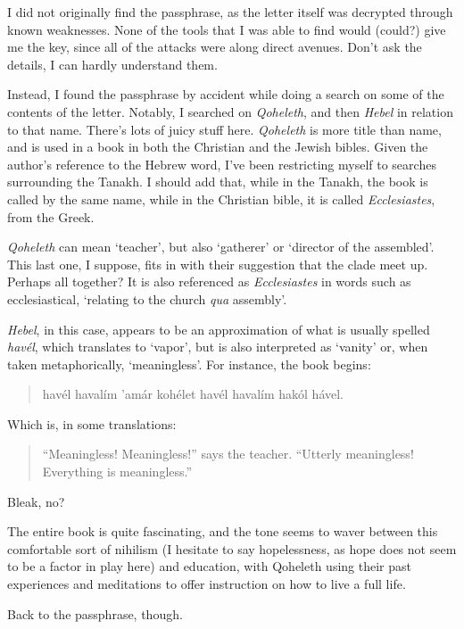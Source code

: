 I did not originally find the passphrase, as the letter itself was decrypted through known weaknesses. None of the tools that I was able to find would (could?) give me the key, since all of the attacks were along direct avenues. Don't ask the details, I can hardly understand them.

Instead, I found the passphrase by accident while doing a search on some of the contents of the letter. Notably, I searched on \emph{Qoheleth}, and then \emph{Hebel} in relation to that name. There's lots of juicy stuff here. \emph{Qoheleth} is more title than name, and is used in a book in both the Christian and the Jewish bibles. Given the author's reference to the Hebrew word, I've been restricting myself to searches surrounding the Tanakh. I should add that, while in the Tanakh, the book is called by the same name, while in the Christian bible, it is called \emph{Ecclesiastes}, from the Greek.

\emph{Qoheleth} can mean `teacher', but also `gatherer' or `director of the assembled'. This last one, I suppose, fits in with their suggestion that the clade meet up. Perhaps all together? It is also referenced as \emph{Ecclesiastes} in words such as ecclesiastical, `relating to the church \emph{qua} assembly'.

\emph{Hebel}, in this case, appears to be an approximation of what is usually spelled \emph{havél}, which translates to `vapor', but is also interpreted as `vanity' or, when taken metaphorically, `meaningless'. For instance, the book begins:

\begin{quote}
havél havalím 'amár kohélet havél havalím hakól hável.
\end{quote}

Which is, in some translations:

\begin{quote}
``Meaningless! Meaningless!'' says the teacher. ``Utterly meaningless! Everything is meaningless.''
\end{quote}

Bleak, no?

The entire book is quite fascinating, and the tone seems to waver between this comfortable sort of nihilism (I hesitate to say hopelessness, as hope does not seem to be a factor in play here) and education, with Qoheleth using their past experiences and meditations to offer instruction on how to live a full life.

Back to the passphrase, though.

